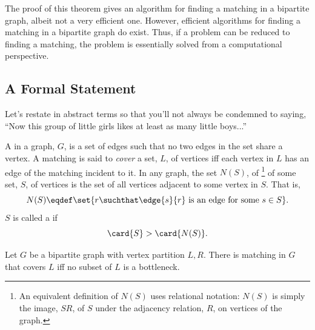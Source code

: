 The proof of this theorem gives an algorithm for finding a matching in a bipartite
graph, albeit not a very efficient one.  However, efficient algorithms for finding a
matching in a bipartite graph do exist.  Thus, if a problem can be reduced to finding
a matching, the problem is essentially solved from a computational perspective.

\subsection{A Formal Statement}

Let's restate  in abstract terms so that you'll not always be
condemned to saying, ``Now this group of little girls likes at least as many little
boys...''

%


A  in a graph, $G$, is a set of edges such that no two edges in the
set share a vertex.  A matching is said to \emph{cover} a set, $L$, of vertices iff
each vertex in $L$ has an edge of the matching incident to it.  In any graph, the set
$N(S)$, of \footnote{An equivalent definition of $N(S)$ uses
relational notation: $N(S)$ is simply the image, $SR$, of $S$ under the adjacency
relation, $R$, on vertices of the graph.} of some set, $S$, of vertices is the set of
all vertices adjacent to some vertex in $S$.  That is,
\[
N(S) \eqdef \set{r \suchthat \edge{s}{r}\text{ is an edge for some }s \in S}.
\]
$S$ is called a  if
\[
\card{S} > \card{N(S)}.
\]

\begin{theorem}
  Let $G$ be a bipartite graph with vertex partition $L,R$.  There is matching in $G$
  that covers $L$ iff no subset of $L$ is a bottleneck.
\end{theorem}

